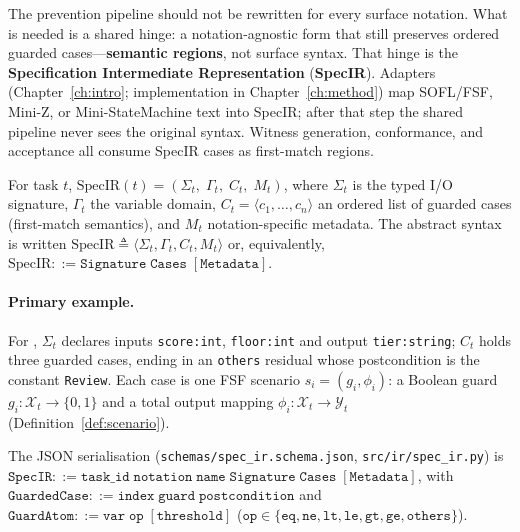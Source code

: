 The prevention pipeline should not be rewritten for every surface notation.
What is needed is a shared hinge: a notation-agnostic form that still preserves
ordered guarded cases---\textbf{semantic regions}, not surface syntax.
That hinge is the \textbf{Specification Intermediate Representation}
(\textbf{SpecIR}).
Adapters (Chapter~\ref{ch:intro}; implementation in Chapter~\ref{ch:method})
map SOFL/FSF, Mini-Z, or Mini-StateMachine text into SpecIR; after that step
the shared pipeline never sees the original syntax.
Witness generation, conformance, and acceptance all consume SpecIR cases as
first-match regions.

\begin{definition}
\label{def:specir}
For task $t$, $\text{SpecIR}(t) = (\Sigma_t,\; \Gamma_t,\; C_t,\; M_t)$, where
$\Sigma_t$ is the typed I/O signature, $\Gamma_t$ the variable domain,
$C_t = \langle c_1,\ldots,c_n\rangle$ an ordered list of guarded cases
(first-match semantics), and $M_t$ notation-specific metadata.
The abstract syntax is written
$\text{SpecIR} \triangleq \langle\Sigma_t, \Gamma_t, C_t, M_t\rangle$ or,
equivalently, $\text{SpecIR} ::= \texttt{Signature}\;\texttt{Cases}\;[\texttt{Metadata}]$.
\end{definition}

\paragraph{Primary example.}
For , $\Sigma_t$ declares inputs
\texttt{score:int}, \texttt{floor:int} and output \texttt{tier:string};
$C_t$ holds three guarded cases, ending in an \texttt{others} residual whose
postcondition is the constant \texttt{Review}.
Each case is one FSF scenario $s_i=(g_i,\phi_i)$: a Boolean guard
$g_i:\mathcal{X}_t\to\{0,1\}$ and a total output mapping
$\phi_i:\mathcal{X}_t\to\mathcal{Y}_t$
(Definition~\ref{def:scenario}).

\begin{definition}
\label{def:specir-ebnf}
The JSON serialisation
(\texttt{schemas/spec\_ir.schema.json}, \texttt{src/ir/spec\_ir.py})
is $\texttt{SpecIR}::=\texttt{task\_id}\;\texttt{notation}\;\texttt{name}\;
\texttt{Signature}\;\texttt{Cases}\;[\texttt{Metadata}]$, with
$\texttt{GuardedCase}::=\texttt{index}\;\texttt{guard}\;\texttt{postcondition}$
and $\texttt{GuardAtom}::=\texttt{var}\;\texttt{op}\;[\texttt{threshold}]$
($\texttt{op}\in\{\texttt{eq},\texttt{ne},\texttt{lt},\texttt{le},\texttt{gt},
\texttt{ge},\texttt{others}\}$).
\end{definition}

